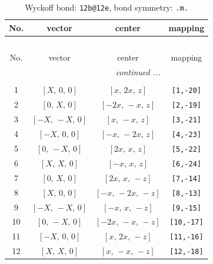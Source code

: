 \documentclass[fleqn,8pt]{jsarticle}
\begin{document}
\begin{longtable}{cccc}
\caption{Wyckoff bond: {\tt 12b@12e}, bond symmetry: {\tt .m.}}
 \\
 \hline \hline
No. & vector & center & mapping \\ \hline \endfirsthead

\multicolumn{3}{l}{\tablename\ \thetable{}} \\
 \hline \hline
No. & vector & center & mapping \\ \hline \endhead

 \hline \hline
\multicolumn{3}{r}{\footnotesize\it continued ...} \\ \endfoot

 \hline \hline
\multicolumn{3}{r}{} \\ \endlastfoot

1 & $\left[ X,\, 0,\, 0 \right]$ & $\left[ x,\, 2 x,\, z \right]$ & {\tt [1,-20]} \\ \hline
2 & $\left[ 0,\, X,\, 0 \right]$ & $\left[ - 2 x,\, - x,\, z \right]$ & {\tt [2,-19]} \\ \hline
3 & $\left[ - X,\, - X,\, 0 \right]$ & $\left[ x,\, - x,\, z \right]$ & {\tt [3,-21]} \\ \hline
4 & $\left[ - X,\, 0,\, 0 \right]$ & $\left[ - x,\, - 2 x,\, z \right]$ & {\tt [4,-23]} \\ \hline
5 & $\left[ 0,\, - X,\, 0 \right]$ & $\left[ 2 x,\, x,\, z \right]$ & {\tt [5,-22]} \\ \hline
6 & $\left[ X,\, X,\, 0 \right]$ & $\left[ - x,\, x,\, z \right]$ & {\tt [6,-24]} \\ \hline
7 & $\left[ 0,\, X,\, 0 \right]$ & $\left[ 2 x,\, x,\, - z \right]$ & {\tt [7,-14]} \\ \hline
8 & $\left[ X,\, 0,\, 0 \right]$ & $\left[ - x,\, - 2 x,\, - z \right]$ & {\tt [8,-13]} \\ \hline
9 & $\left[ - X,\, - X,\, 0 \right]$ & $\left[ - x,\, x,\, - z \right]$ & {\tt [9,-15]} \\ \hline
10 & $\left[ 0,\, - X,\, 0 \right]$ & $\left[ - 2 x,\, - x,\, - z \right]$ & {\tt [10,-17]} \\ \hline
11 & $\left[ - X,\, 0,\, 0 \right]$ & $\left[ x,\, 2 x,\, - z \right]$ & {\tt [11,-16]} \\ \hline
12 & $\left[ X,\, X,\, 0 \right]$ & $\left[ x,\, - x,\, - z \right]$ & {\tt [12,-18]} \\
\end{longtable}
\renewcommand{\arraystretch}{1.2}
\end{document}
